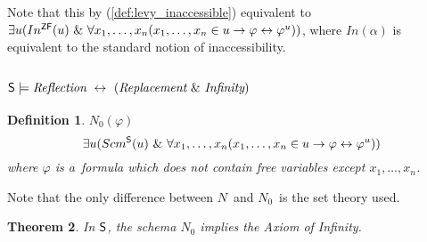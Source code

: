 \documentclass[12pt,a4paper]{article}
\newtheorem{theorem}{Theorem}[section]
\newtheorem{definition}[theorem]{Definition}
\renewcommand{\iff}{\leftrightarrow}
\newcommand{\then}{\rightarrow}
\begin{document}
Note that this by (\ref{def:levy_inaccessible}) equivalent to $\exists u (In^{\sf{ZF}}(u)\ \&\ \forall x_1, \ldots , x_n (x_1, \ldots , x_n \in u \then \varphi \iff \varphi^{u}))$, where $In(\alpha)$ is equivalent to the standard notion of inaccessibility.
\subsection{$\sf{S} \models \emph{Reflection}\ \iff\ (\emph{Replacement}\ \&\ \emph{Infinity})$} 

\begin{definition}{$N_0(\varphi)$}
\begin{equation}
\exists u (Scm^{\sf{S}}(u)\ \&\ \forall x_1, \ldots , x_n (x_1, \ldots , x_n \in u \then \varphi \iff \varphi^{u}))
\end{equation}
where $\varphi$ is a~formula which does not contain free variables except $x_1, \ldots , x_n$.
\end{definition}

Note that the only difference between $N$ and $N_0$ is the set theory used.

\begin{theorem}
In $\sf{S}$, the schema $N_0$ implies the Axiom of Infinity.
\end{theorem}
\end{document}
